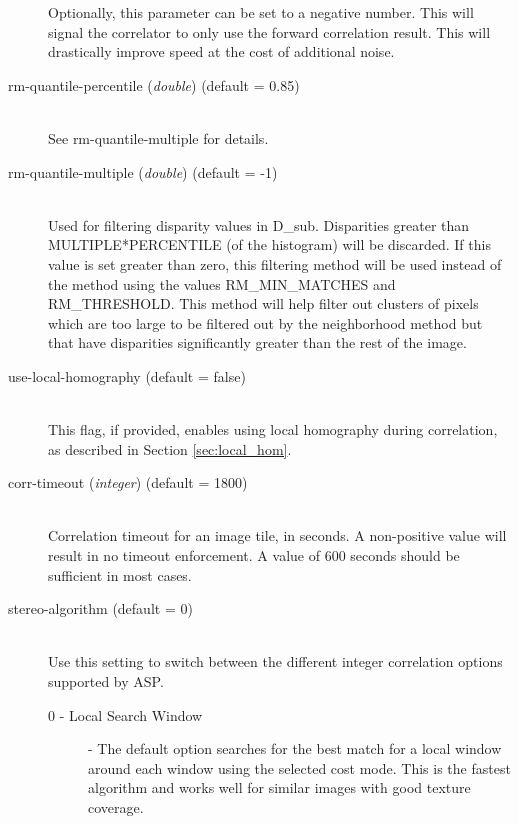 \begin{description}
  Optionally, this parameter can be set to a negative number. This
  will signal the correlator to only use the forward correlation
  result. This will drastically improve speed at the cost of
  additional noise.

\item[rm-quantile-percentile \textnormal{\small{(\emph{double})}} (default = 0.85)] \hfill \\
  See rm-quantile-multiple for details.

\item[rm-quantile-multiple \textnormal{\small{(\emph{double})}} (default = -1)] \hfill \\
  Used for filtering disparity values in D\_sub.  Disparities 
  greater than MULTIPLE*PERCENTILE (of the histogram) will be discarded.  
  If this value is set greater
  than zero, this filtering method will be used instead of the
  method using the values RM\_MIN\_MATCHES and RM\_THRESHOLD.
  This method will help filter out clusters of pixels which are too large to be
  filtered out by the neighborhood method but that have disparities significantly
  greater than the rest of the image.

\item[use-local-homography \textnormal (default = false)] \hfill \\

  This flag, if provided, enables using local homography during
  correlation, as described in Section \ref{sec:local_hom}.

\item[corr-timeout \textnormal{\small{(\emph{integer})}} (default = 1800)]\hfill \\

  Correlation timeout for an image tile, in seconds. A non-positive
value will result in no timeout enforcement. A value of 600 seconds
should be sufficient in most cases.

\item[stereo-algorithm \textnormal (default = 0)] \hfill \\

  Use this setting to switch between the different integer correlation options supported by ASP.  
  \begin{description}
    \item[0 - Local Search Window] - The default option searches for the best match
    for a local window around each window using the selected cost mode.  This is the 
    fastest algorithm and works well for similar images with good texture coverage.


\end{description}
\end{description}
